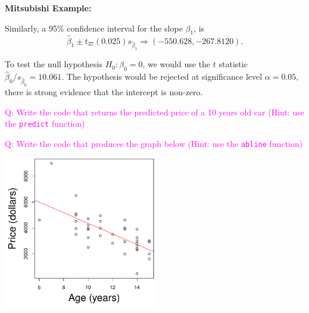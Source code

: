 \documentclass[landscape]{slides}
\newcommand{\heading}[1]{%
  \begin{center}
    \large\bf \color{red}
        #1
  \end{center}
  \vspace{1ex minus 1ex}}
\begin{document}
\begin{slide}
\heading{Mitsubishi Example:}

Similarly, a 95\% confidence interval for the slope $\beta_1$, is
$$\hat{\beta}_1\pm t_{37}(0.025)s_{\hat{\beta}_1} \Longrightarrow (-550.628, -267.8120).$$

To test the null hypothesis $H_0:\beta_0=0$, we would use the $t$ statistic
$\hat{\beta}_0/s_{\hat{\beta}_0}=10.061$. The hypothesis would be rejected at significance level
$\alpha=0.05$, there is strong evidence that the intercept is non-zero.

\textcolor{magenta}{Q: Write the code that returns the predicted price of a 10 years old car (Hint: use the {\tt predict} function)}

\textcolor{magenta}{Q: Write the code that produces the graph below (Hint: use the {\tt abline} function)}
\begin{center}
\includegraphics[width=0.5\textwidth]{figures/7-LinearModels-Figures/mitsub_reg.pdf}
\end{center}

\end{slide}
\end{document}
